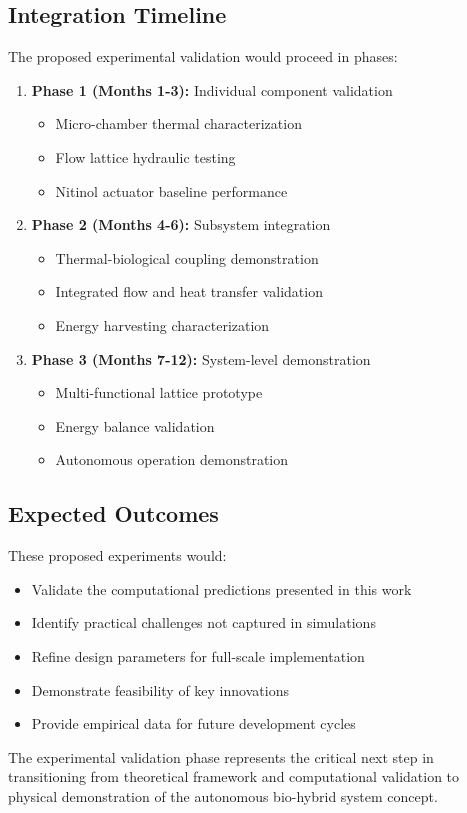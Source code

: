 \subsection{Integration Timeline}

The proposed experimental validation would proceed in phases:

\begin{enumerate}
    \item \textbf{Phase 1 (Months 1-3):} Individual component validation
    \begin{itemize}
        \item Micro-chamber thermal characterization
        \item Flow lattice hydraulic testing
        \item Nitinol actuator baseline performance
    \end{itemize}
    
    \item \textbf{Phase 2 (Months 4-6):} Subsystem integration
    \begin{itemize}
        \item Thermal-biological coupling demonstration
        \item Integrated flow and heat transfer validation
        \item Energy harvesting characterization
    \end{itemize}
    
    \item \textbf{Phase 3 (Months 7-12):} System-level demonstration
    \begin{itemize}
        \item Multi-functional lattice prototype
        \item Energy balance validation
        \item Autonomous operation demonstration
    \end{itemize}
\end{enumerate}

\subsection{Expected Outcomes}

These proposed experiments would:
\begin{itemize}
    \item Validate the computational predictions presented in this work
    \item Identify practical challenges not captured in simulations
    \item Refine design parameters for full-scale implementation
    \item Demonstrate feasibility of key innovations
    \item Provide empirical data for future development cycles
\end{itemize}

The experimental validation phase represents the critical next step in transitioning from theoretical framework and computational validation to physical demonstration of the autonomous bio-hybrid system concept.
